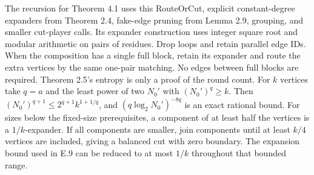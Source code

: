 \documentclass[11pt]{article}
\begin{document}
\begin{itemize}
  The recursion for Theorem 4.1 uses this RouteOrCut, explicit constant-degree expanders from Theorem 2.4, fake-edge pruning from Lemma 2.9, grouping, and smaller cut-player calls. Its expander construction uses integer square root and modular arithmetic on pairs of residues. Drop loops and retain parallel edge IDs. When the composition has a single full block, retain its expander and route the extra vertices by the same one-pair matching. No edges between full blocks are required. Theorem 2.5's entropy is only a proof of the round count. For \(k\) vertices take \(q=a\) and the least power of two \(N_0'\) with \((N_0')^q\ge k\). Then \((N_0')^{q+1}\le 2^{q+1} k^{1+1/q}\), and \((q\log_2 N_0')^{-8q}\) is an exact rational bound. For sizes below the fixed-size prerequisites, a component of at least half the vertices is a \(1/k\)-expander. If all components are smaller, join components until at least \(k/4\) vertices are included, giving a balanced cut with zero boundary. The expansion bound used in E.9 can be reduced to at most \(1/k\) throughout that bounded range.


\end{itemize}
\end{document}
